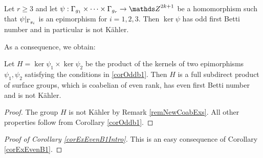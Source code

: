 \begin{corollary}
 Let $r\geq 3$ and let $\psi: \G_{g_1}\times \dots \times \G_{g_r}\rightarrow \ZZ^{2k+1}$ be a homomorphism such that $\psi|_{\Gamma_{g_i}}$ is an epimorphism for $i=1,2,3$. Then $\ker \psi$ has odd first Betti number and in particular is not K\"ahler.
 \label{corOddb1}
\end{corollary}

As a consequence, we obtain:

\begin{corollary}
Let $H=\ker \psi_1 \times \ker \psi_2$ be the product of the kernels of two epimorphisms $\psi_1,\psi_2$ satisfying the conditions in \ref{corOddb1}. Then $H$ is a full subdirect product of surface groups, which is coabelian of even rank, has even first Betti number and is not K\"ahler.
\label{corExEvenB1}
\end{corollary}
\begin{proof}
 The group $H$ is not K\"ahler by Remark \ref{remNewCoabExs}. All other properties follow from Corollary \ref{corOddb1}.
\end{proof}

\begin{proof}[Proof of Corollary \ref{corExEvenB1Intro}]
This is an easy consequence of Corollary \ref{corExEvenB1}.
\end{proof}




